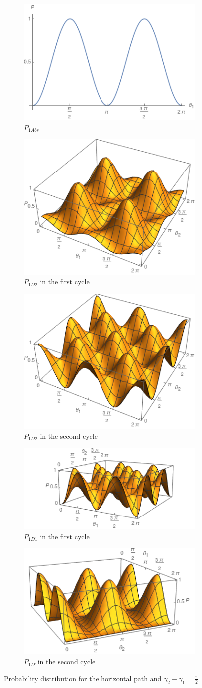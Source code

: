 \documentclass[12pt]{article}
\begin{document}
\begin{figure}[h!]
\centering
\begin{subfigure}[b]{0.35\linewidth}
\includegraphics[width=\linewidth,height=3 cm]{images/Pc1Abs.png}
\caption{$P_{1Abs}$}
\label{fig:BS1}
\end{subfigure}
\begin{subfigure}[b]{0.35\linewidth}
\includegraphics[width=\linewidth,height=3 cm]{images/Pc1D21.png}
\caption{$P_{1D2}$ in the first cycle }
\label{fig:BS1}
\end{subfigure}
\begin{subfigure}[b]{0.35\linewidth}
\includegraphics[width=\linewidth,height=3 cm]{images/Pc1D22.png}
\caption{$P_{1D2}$ in the second cycle}
\label{fig:BS1}
\end{subfigure}
\begin{subfigure}[b]{0.35\linewidth}
\includegraphics[width=\linewidth,height=3 cm]{images/Pc1D11.png}
\caption{$P_{1D1} $ in the first cycle}
\label{fig:westminster_aerea}
\end{subfigure}
\begin{subfigure}[b]{0.35\linewidth}
\includegraphics[width=\linewidth,height=3 cm]{images/Pc1D12.png}
\caption{$P_{1D1} $in the second cycle }
\label{fig:BS1}
\end{subfigure}
\caption{Probability distribution for the horizontal path and  $\gamma_{2}-\gamma_{1}=\frac{\pi}{2}$}
\label{fig:westminster}
\end{figure}
\end{document}
